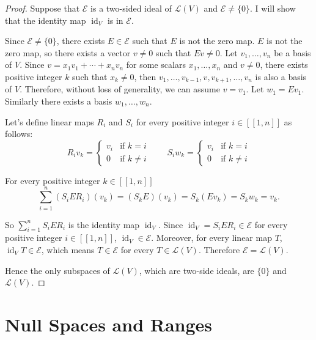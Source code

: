 \begin{proof}
    Suppose that $\mathcal{E}$ is a two-sided ideal of $\mathcal{L}(V)$ and $\mathcal{E}\ne \{0\}$. I will show that the identity map $\operatorname{id}_{V}$ is in $\mathcal{E}$.

    Since $\mathcal{E}\ne \{0\}$, there exists $E\in\mathcal{E}$ such that $E$ is not the zero map. $E$ is not the zero map, so there exists a vector $v\ne 0$ such that $Ev\ne 0$. Let $v_{1}, \ldots, v_{n}$ be a basis of $V$. Since $v = x_{1}v_{1} + \cdots + x_{n}v_{n}$ for some scalars $x_{1}, \ldots, x_{n}$ and $v\ne 0$, there exists positive integer $k$ such that $x_{k}\ne 0$, then $v_{1}, \ldots, v_{k-1}, v, v_{k+1}, \ldots, v_{n}$ is also a basis of $V$. Therefore, without loss of generality, we can assume $v = v_{1}$. Let $w_{1} = Ev_{1}$. Similarly there exists a basis $w_{1}, \ldots, w_{n}$.

    Let's define linear maps $R_{i}$ and $S_{i}$ for every positive integer $i\in [\![ 1, n ]\!]$ as follows:
    \[
        R_{i}v_{k} = \begin{cases}
            v_{i} & \text{if $k = i$}  \\
            0     & \text{if $k\ne i$}
        \end{cases}
        \qquad
        S_{i}w_{k} = \begin{cases}
            v_{i} & \text{if $k = i$}  \\
            0     & \text{if $k\ne i$}
        \end{cases}
    \]

    For every positive integer $k\in [\![ 1, n ]\!]$
    \[
        \sum^{n}_{i=1}(S_{i}ER_{i})(v_{k}) = (S_{k}E)(v_{k}) = S_{k}(Ev_{k}) = S_{k}w_{k} = v_{k}.
    \]

    So $\sum^{n}_{i=1}S_{i}ER_{i}$ is the identity map $\operatorname{id}_{V}$. Since $\operatorname{id}_{V} = S_{i}ER_{i}\in\mathcal{E}$ for every positive integer $i\in [\![ 1, n ]\!]$, $\operatorname{id}_{V}\in\mathcal{E}$. Moreover, for every linear map $T$, $\operatorname{id}_{V}T\in\mathcal{E}$, which means $T\in\mathcal{E}$ for every $T\in\mathcal{L}(V)$. Therefore $\mathcal{E} = \mathcal{L}(V)$.

    Hence the only subspaces of $\mathcal{L}(V)$, which are two-side ideals, are $\{0\}$ and $\mathcal{L}(V)$.
\end{proof}
\newpage

\section{Null Spaces and Ranges}

